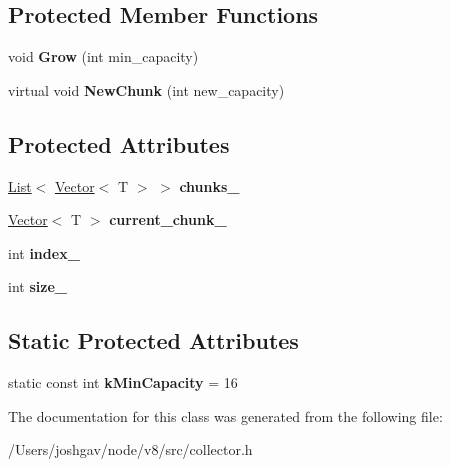 \subsection*{Protected Member Functions}
\begin{DoxyCompactItemize}
\item 
void {\bfseries Grow} (int min\+\_\+capacity)\hypertarget{classv8_1_1internal_1_1_collector_a64538c3871b9027c063536b7422e4934}{}\label{classv8_1_1internal_1_1_collector_a64538c3871b9027c063536b7422e4934}

\item 
virtual void {\bfseries New\+Chunk} (int new\+\_\+capacity)\hypertarget{classv8_1_1internal_1_1_collector_ae5c13b4d64ac101f050251ce9b9f633e}{}\label{classv8_1_1internal_1_1_collector_ae5c13b4d64ac101f050251ce9b9f633e}

\end{DoxyCompactItemize}
\subsection*{Protected Attributes}
\begin{DoxyCompactItemize}
\item 
\hyperlink{classv8_1_1internal_1_1_list}{List}$<$ \hyperlink{classv8_1_1internal_1_1_vector}{Vector}$<$ T $>$ $>$ {\bfseries chunks\+\_\+}\hypertarget{classv8_1_1internal_1_1_collector_ab31539f889091d726729e118118fcbb5}{}\label{classv8_1_1internal_1_1_collector_ab31539f889091d726729e118118fcbb5}

\item 
\hyperlink{classv8_1_1internal_1_1_vector}{Vector}$<$ T $>$ {\bfseries current\+\_\+chunk\+\_\+}\hypertarget{classv8_1_1internal_1_1_collector_ae18ddaaf7f76b38ad5fc776374f8e54b}{}\label{classv8_1_1internal_1_1_collector_ae18ddaaf7f76b38ad5fc776374f8e54b}

\item 
int {\bfseries index\+\_\+}\hypertarget{classv8_1_1internal_1_1_collector_a450843df09b65a6b00a2dbd1df9f6dd1}{}\label{classv8_1_1internal_1_1_collector_a450843df09b65a6b00a2dbd1df9f6dd1}

\item 
int {\bfseries size\+\_\+}\hypertarget{classv8_1_1internal_1_1_collector_a18fc8b51241e805a2980ba8aaacc1c5b}{}\label{classv8_1_1internal_1_1_collector_a18fc8b51241e805a2980ba8aaacc1c5b}

\end{DoxyCompactItemize}
\subsection*{Static Protected Attributes}
\begin{DoxyCompactItemize}
\item 
static const int {\bfseries k\+Min\+Capacity} = 16\hypertarget{classv8_1_1internal_1_1_collector_a559be84477f49672e512b636e6b6d8bb}{}\label{classv8_1_1internal_1_1_collector_a559be84477f49672e512b636e6b6d8bb}

\end{DoxyCompactItemize}


The documentation for this class was generated from the following file\+:\begin{DoxyCompactItemize}
\item 
/\+Users/joshgav/node/v8/src/collector.\+h\end{DoxyCompactItemize}

